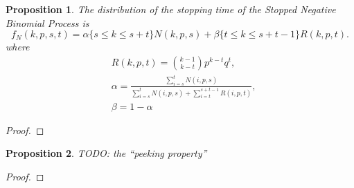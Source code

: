 \documentclass{article}
\newtheorem{prop}{Proposition}
\begin{document}
\begin{prop}
The distribution of the stopping time of the Stopped Negative Binomial Process 
is 
\begin{equation*}
f_N(k, p, s, t) = \alpha \{s \leq k \leq s+t\} N(k, p, s) + 
  \beta \{t \leq k \leq s+t-1 \} R(k, p, t).
\end{equation*}
where 
\begin{align*}
&R(k, p, t) = {k-1 \choose k-t} p^{k-t} q^t, \\
&\alpha = \frac{\sum_{i=s}^t N(i, p, s)}
  {\sum_{i=s}^t N(i, p, s) + \sum_{i=t}^{s+t-1} R(i, p, t)}, \\
&\beta = 1 - \alpha
\end{align*}

\end{prop}
\begin{proof}
\end{proof}

\begin{prop}
TODO: the ``peeking property''
\end{prop}
\begin{proof}
\end{proof}
\end{document}
